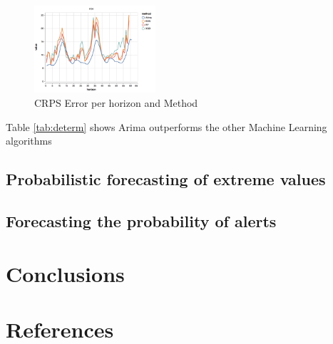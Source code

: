\documentclass[a4paper,twocolumn,5p]{elsarticle}
\begin{document}
\begin{figure}
  \caption{CRPS Error per horizon and Method}
  \centering
      \includegraphics[width=0.4\textwidth]{results/crps}
\end{figure}

Table \ref{tab:determ} shows Arima outperforms the other Machine Learning algorithms


\subsection{Probabilistic forecasting of extreme values}
\label{sec:probabilistic}


\subsection{Forecasting the probability of alerts}
\label{sec:alertProb2}


\section{Conclusions}
\label{sec:concl}


\section*{References}


\end{document}
